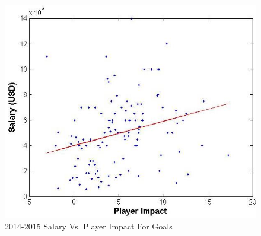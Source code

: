 \documentclass[]{article}
\begin{document}
\begin{figure}[ht]
\includegraphics[width = 1.0\columnwidth]{player_impact_vs_salary}
\caption{2014-2015 Salary Vs. Player Impact For Goals}
\label{fig:scatterplot-salary-impact}
\end{figure}


%
%

%
%
%
\end{document}
